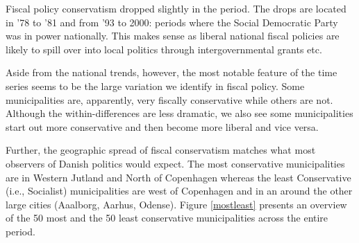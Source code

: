 \documentclass[a4paper,12pt]{article}
\begin{document}
Fiscal policy conservatism dropped slightly in the period. The drops are located in '78 to '81 and from '93 to 2000: periods where the Social Democratic Party was in power nationally. This makes sense as liberal national fiscal policies are likely to spill over into local politics through intergovernmental grants etc.

Aside from the national trends, however, the most notable feature of the time series seems to be the large variation we identify in fiscal policy. Some municipalities are, apparently, very fiscally conservative while others are not. Although the within-differences are less dramatic, we also see some municipalities start out more conservative and then become more liberal and vice versa.

Further, the geographic spread of fiscal conservatism matches what most observers of Danish politics would expect. The most conservative municipalities are in Western Jutland and North of Copenhagen whereas the least Conservative (i.e., Socialist) municipalities are west of Copenhagen and in an around the other large cities (Aaalborg, Aarhus, Odense). 
Figure \ref{mostleast} presents an overview of the 50 most and the 50 least conservative municipalities across the entire period.
\end{document}
